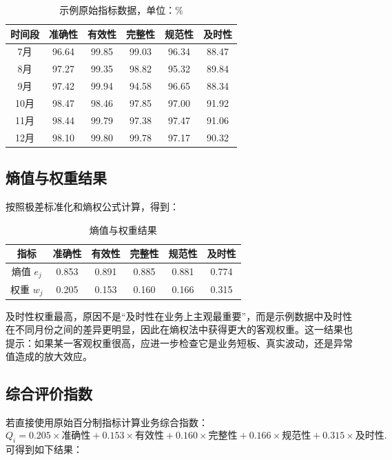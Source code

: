 \documentclass[UTF8,zihao=-4]{ctexart}
\begin{document}
\begin{table}[H]
\centering
\caption{示例原始指标数据，单位：\%}
\begin{tabular}{cccccc}
\toprule
时间段 & 准确性 & 有效性 & 完整性 & 规范性 & 及时性 \\
\midrule
7月  & 96.64 & 99.85 & 99.03 & 96.34 & 88.47 \\
8月  & 97.27 & 99.35 & 98.82 & 95.32 & 89.84 \\
9月  & 97.42 & 99.94 & 94.58 & 96.65 & 88.34 \\
10月 & 98.47 & 98.46 & 97.85 & 97.00 & 91.92 \\
11月 & 98.44 & 99.79 & 97.38 & 97.47 & 91.06 \\
12月 & 98.10 & 99.80 & 99.78 & 97.17 & 90.32 \\
\bottomrule
\end{tabular}
\end{table}

\subsection{熵值与权重结果}
按照极差标准化和熵权公式计算，得到：

\begin{table}[H]
\centering
\caption{熵值与权重结果}
\begin{tabular}{cccccc}
\toprule
指标 & 准确性 & 有效性 & 完整性 & 规范性 & 及时性 \\
\midrule
熵值 $e_j$ & 0.853 & 0.891 & 0.885 & 0.881 & 0.774 \\
权重 $w_j$ & 0.205 & 0.153 & 0.160 & 0.166 & 0.315 \\
\bottomrule
\end{tabular}
\end{table}

及时性权重最高，原因不是“及时性在业务上主观最重要”，而是示例数据中及时性在不同月份之间的差异更明显，因此在熵权法中获得更大的客观权重。这一结果也提示：如果某一客观权重很高，应进一步检查它是业务短板、真实波动，还是异常值造成的放大效应。

\subsection{综合评价指数}
若直接使用原始百分制指标计算业务综合指数：
\begin{equation}
Q_i=0.205\times\text{准确性}+0.153\times\text{有效性}+0.160\times\text{完整性}+0.166\times\text{规范性}+0.315\times\text{及时性}.
\end{equation}
可得到如下结果：
\end{document}
